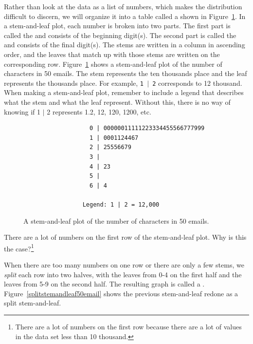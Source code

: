 Rather than look at the data as a list of numbers, which makes the distribution difficult to discern, we will organize it into a table called a  shown in Figure~\ref{stemandleafemail50}. In a stem-and-leaf plot, each number is broken into two parts. The first part is called the  and consists of the beginning digit(s). The second part is called the  and consists of the final digit(s). The stems are written in a column in ascending order, and the leaves that match up with those stems are written on the corresponding row. Figure~\ref{stemandleafemail50} shows a stem-and-leaf plot of the number of characters in 50 emails. The stem represents the ten thousands place and the leaf represents the thousands place. For example, \texttt{1 $|$ 2} corresponds to 12 thousand. When making a stem-and-leaf plot, remember to include a legend that describes what the stem and what the leaf represent. Without this, there is no way of knowing if 1 $|$ 2  represents 1.2, 12, 120, 1200, etc.

\begin{figure}[h]
\begin{verbatim}
                   0 | 00000011111223334455566777999
                   1 | 0001124467
                   2 | 25556679
                   3 |
                   4 | 23
                   5 |
                   6 | 4

                 Legend: 1 | 2 = 12,000
\end{verbatim}
\caption{A stem-and-leaf plot of the number of characters in 50 emails.}
\label{stemandleafemail50}
\end{figure}

\begin{exercise}There are a lot of numbers on the first row of the stem-and-leaf plot. Why is this the case?\footnote{There are a lot of numbers on the first row because there are a lot of values in the data set less than 10 thousand.}
\end{exercise}

When there are too many numbers on one row or there are only a few stems, we \emph{split} each row into two halves, with the leaves from 0-4 on the first half and the leaves from 5-9 on the second half. The resulting graph is called a . Figure~\ref{splitstemandleaf50email} shows the previous stem-and-leaf redone as a split stem-and-leaf.

